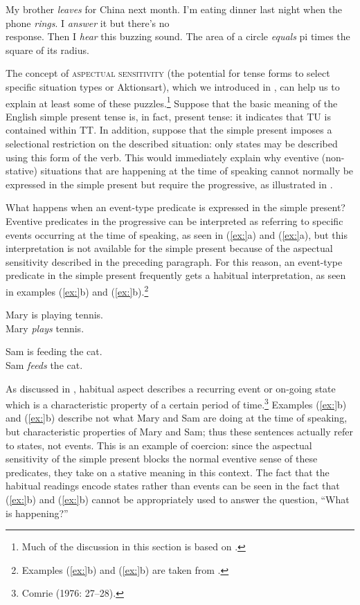 \ea
\ea My brother \textit{leaves} for China next month.
\ex  I’m eating dinner last night when the phone \textit{rings}. I \textit{answer} it but there’s no\\
  response. Then I \textit{hear} this buzzing sound.
\ex  The area of a circle \textit{equals} pi times the square of its radius. 
\z \z


The concept of \textsc{aspectual sensitivity} (the potential for tense forms to select specific situation types or Aktionsart), which we introduced in , can help us to explain at least some of these puzzles.\footnote{Much of the discussion in this section is based on \citet{Michaelis2006}.} Suppose that the basic meaning of the English simple present tense is, in fact, present tense: it indicates that TU is contained within TT. In addition, suppose that the simple present imposes a selectional restriction on the described situation: only states may be described using this form of the verb. This would immediately explain why eventive (non-stative) situations that are happening at the time of speaking cannot normally be expressed in the simple present but require the progressive, as illustrated in .



What happens when an event-type predicate is expressed in the simple present? Eventive predicates in the progressive can be interpreted as referring to specific events occurring at the time of speaking, as seen in (\ref{ex:}a) and (\ref{ex:}a), but this interpretation is not available for the simple present because of the aspectual sensitivity described in the preceding paragraph. For this reason, an event-type predicate in the simple present frequently gets a habitual interpretation, as seen in examples (\ref{ex:}b) and (\ref{ex:}b).\footnote{Examples (\ref{ex:}b) and (\ref{ex:}b) are taken from \citet[185]{Smith1997}.}


\ea
\ea Mary is playing tennis.\\
\ex Mary \textit{plays} tennis.
                       \z
\z

\ea
\ea Sam is feeding the cat.\\
\ex Sam \textit{feeds} the cat.
                       \z
\z

As discussed in , habitual aspect describes a recurring event or on-going state which is a characteristic property of a certain period of time.\footnote{Comrie (1976: 27–28).} Examples (\ref{ex:}b) and (\ref{ex:}b) describe not what Mary and Sam are doing at the time of speaking, but characteristic properties of Mary and Sam; thus these sentences actually refer to states, not events. This is an example of coercion: since the aspectual sensitivity of the simple present blocks the normal eventive sense of these predicates, they take on a stative meaning in this context. The fact that the habitual readings encode states rather than events can be seen in the fact that (\ref{ex:}b) and (\ref{ex:}b) cannot be appropriately used to answer the question, “What is happening?”


